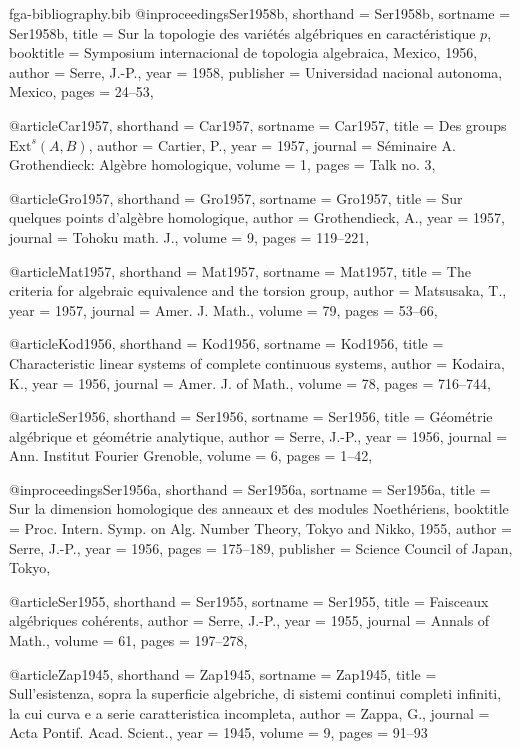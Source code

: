 \begin{filecontents*}{fga-bibliography.bib}
    @inproceedings{Ser1958b,
  shorthand = {Ser1958b},
  sortname = {Ser1958b},
  title = {Sur la topologie des vari\'{e}t\'{e}s alg\'{e}briques en caract\'{e}ristique $p$},
  booktitle = {Symposium internacional de topologia algebraica, {{Mexico}}, 1956},
  author = {Serre, J.-P.},
  year = {1958},
  publisher = {{Universidad nacional autonoma, Mexico}},
  pages = {24--53},
}

    @article{Car1957,
  shorthand = {Car1957},
  sortname = {Car1957},
  title = {Des groups $\mathrm{Ext}^s(A,B)$},
  author = {Cartier, P.},
  year = {1957},
  journal = {S\'{e}minaire A. Grothendieck: Alg\`{e}bre homologique},
  volume = {1},
  pages = {Talk no. 3},
}

    @article{Gro1957,
  shorthand = {Gro1957},
  sortname = {Gro1957},
  title = {Sur quelques points d'alg\`{e}bre homologique},
  author = {Grothendieck, A.},
  year = {1957},
  journal = {Tohoku math. J.},
  volume = {9},
  pages = {119--221},
}

    @article{Mat1957,
  shorthand = {Mat1957},
  sortname = {Mat1957},
  title = {The criteria for algebraic equivalence and the torsion group},
  author = {Matsusaka, T.},
  year = {1957},
  journal = {Amer. J. Math.},
  volume = {79},
  pages = {53--66},
}

    @article{Kod1956,
  shorthand = {Kod1956},
  sortname = {Kod1956},
  title = {Characteristic linear systems of complete continuous systems},
  author = {Kodaira, K.},
  year = {1956},
  journal = {Amer. J. of Math.},
  volume = {78},
  pages = {716--744},
}

    @article{Ser1956,
  shorthand = {Ser1956},
  sortname = {Ser1956},
  title = {G\'{e}om\'{e}trie alg\'{e}brique et g\'{e}om\'{e}trie analytique},
  author = {Serre, J.-P.},
  year = {1956},
  journal = {Ann. Institut Fourier Grenoble},
  volume = {6},
  pages = {1--42},
}

    @inproceedings{Ser1956a,
  shorthand = {Ser1956a},
  sortname = {Ser1956a},
  title = {Sur la dimension homologique des anneaux et des modules {{Noeth\'{e}riens}}},
  booktitle = {Proc. {{Intern}}. {{Symp}}. on Alg. Number Theory, {{Tokyo}} and {{Nikko}}, 1955},
  author = {Serre, J.-P.},
  year = {1956},
  pages = {175--189},
  publisher = {{Science Council of Japan, Tokyo}},
}

    @article{Ser1955,
  shorthand = {Ser1955},
  sortname = {Ser1955},
  title = {Faisceaux alg\'{e}briques coh\'{e}rents},
  author = {Serre, J.-P.},
  year = {1955},
  journal = {Annals of Math.},
  volume = {61},
  pages = {197--278},
}

    @article{Zap1945,
  shorthand = {Zap1945},
  sortname = {Zap1945},
  title = {Sull'esistenza, sopra la superficie algebriche, di sistemi continui completi infiniti, la cui curva e a serie caratteristica incompleta},
  author = {Zappa, G.},
  journal = {Acta Pontif. Acad. Scient.},
  year = {1945},
  volume = {9},
  pages = {91--93}
}

    

\end{filecontents*}
